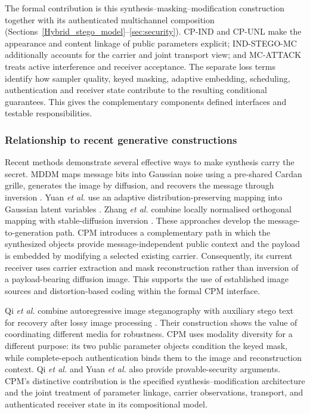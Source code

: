 \documentclass[pdflatex,sn-mathphys-num]{sn-jnl}%
\theoremstyle{definition}
\theoremstyle{game}
\theoremstyle{thmstyleone}%
\theoremstyle{thmstyletwo}%
\theoremstyle{thmstylethree}%
\begin{document}
The formal contribution is this synthesis--masking--modification
construction together with its authenticated multichannel composition
(Sections~\ref{Hybrid_stego_model}--\ref{sec:security}). CP-IND and CP-UNL
make the appearance and content linkage of public parameters explicit;
IND-STEGO-MC additionally accounts for the carrier and joint transport
view; and MC-ATTACK treats active interference and receiver acceptance.
The separate loss terms identify how sampler quality, keyed masking,
adaptive embedding, scheduling, authentication and receiver state
contribute to the resulting conditional guarantees. This gives the complementary
components defined interfaces and testable responsibilities.

\subsubsection{Relationship to recent generative constructions}
Recent methods demonstrate several effective ways to make synthesis carry
the secret. MDDM maps message bits into Gaussian noise using a pre-shared
Cardan grille, generates the image by diffusion, and recovers the message
through inversion \cite{xu2025mddm}. Yuan \emph{et al.} use an adaptive
distribution-preserving mapping into Gaussian latent variables
\cite{yuan2026provably}. Zhang \emph{et al.} combine locally normalised
orthogonal mapping with stable-diffusion inversion
\cite{Zhang2026MappingDiffusion}. These approaches develop the
message-to-generation path. CPM introduces a complementary path in which
the synthesized objects provide message-independent public context and
the payload is embedded by modifying a selected existing carrier.
Consequently, its current receiver uses carrier extraction and mask
reconstruction rather than inversion of a payload-bearing diffusion image.
This supports the use of established image sources and distortion-based
coding within the formal CPM interface.

Qi \emph{et al.} combine autoregressive image steganography with auxiliary
stego text for recovery after lossy image processing
\cite{qi2025provably}. Their construction shows the value of coordinating
different media for robustness. CPM uses modality diversity for a different
purpose: its two public parameter objects condition the keyed mask, while
complete-epoch authentication binds them to the image and reconstruction
context. Qi \emph{et al.} and Yuan \emph{et al.} also provide
provable-security arguments. CPM's distinctive contribution is the
specified synthesis--modification architecture and the joint treatment of
parameter linkage, carrier observations, transport, and authenticated
receiver state in its compositional model.
\end{document}
